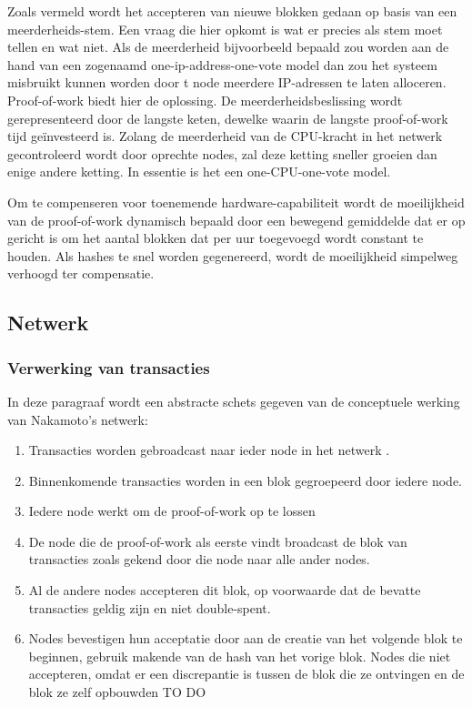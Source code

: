 	Zoals vermeld wordt het accepteren van nieuwe blokken gedaan op basis van een meerderheids-stem. Een vraag die hier opkomt is wat er precies als stem moet tellen en wat niet. Als de meerderheid bijvoorbeeld bepaald zou worden aan de hand van een zogenaamd one-ip-address-one-vote model dan zou het systeem misbruikt kunnen worden door t node meerdere IP-adressen te laten alloceren. Proof-of-work biedt hier de oplossing. De meerderheidsbeslissing wordt gerepresenteerd door de langste keten, dewelke waarin de langste proof-of-work tijd geïnvesteerd is. Zolang de meerderheid van de CPU-kracht in het netwerk gecontroleerd wordt door oprechte nodes, zal deze ketting sneller groeien dan enige andere ketting. In essentie is het een one-CPU-one-vote model.
	
	Om te compenseren voor toenemende hardware-capabiliteit wordt de moeilijkheid van de proof-of-work dynamisch bepaald door een bewegend gemiddelde dat er op gericht is om het aantal blokken dat per uur toegevoegd wordt constant te houden. Als hashes te snel worden gegenereerd, wordt de moeilijkheid simpelweg verhoogd ter compensatie. 
	\subsection{Netwerk}
		\subsubsection{Verwerking  van transacties}
		In deze paragraaf wordt een abstracte schets gegeven van de conceptuele werking van Nakamoto’s netwerk:
		\begin{enumerate}
			\item Transacties worden gebroadcast naar ieder node in het netwerk
	.
			\item Binnenkomende transacties worden in een blok gegroepeerd door iedere node.
			\item Iedere node werkt om de proof-of-work op te lossen
			\item De node die de proof-of-work als eerste vindt broadcast de blok van transacties zoals gekend door die node naar alle ander nodes.
			\item Al de andere nodes accepteren dit blok, op voorwaarde dat de bevatte transacties geldig zijn en niet double-spent.
			\item Nodes bevestigen hun acceptatie door aan de creatie van het volgende blok te beginnen, gebruik makende van de hash van het vorige blok. Nodes die niet accepteren, omdat er een discrepantie is tussen de blok die ze ontvingen en de blok ze zelf opbouwden TO DO 
		\end{enumerate}

